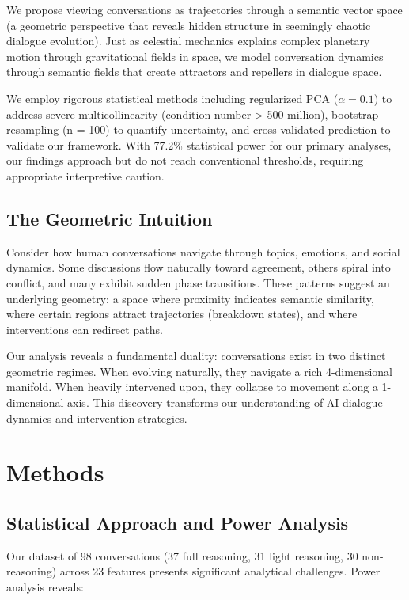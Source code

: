 \documentclass[11pt,letterpaper]{article}
\newcommand{\totalConversations}{98}
\newcommand{\fullReasoningCount}{37}
\newcommand{\lightReasoningCount}{31}
\newcommand{\nonReasoningCount}{30}
\newcommand{\featureCount}{23}
\newcommand{\powerOutcomeGroups}{77.2\%}
\newcommand{\regularizationAlpha}{0.1}
\newcommand{\bootstrapSamples}{100}
\begin{document}
We propose viewing conversations as trajectories through a semantic vector space (a geometric perspective that reveals hidden structure in seemingly chaotic dialogue evolution). Just as celestial mechanics explains complex planetary motion through gravitational fields in space, we model conversation dynamics through semantic fields that create attractors and repellers in dialogue space.

We employ rigorous statistical methods including regularized PCA ($\alpha = \regularizationAlpha{}$) to address severe multicollinearity (condition number > 500 million), bootstrap resampling (n = \bootstrapSamples{}) to quantify uncertainty, and cross-validated prediction to validate our framework. With \powerOutcomeGroups{} statistical power for our primary analyses, our findings approach but do not reach conventional thresholds, requiring appropriate interpretive caution.

\subsection{The Geometric Intuition}

Consider how human conversations navigate through topics, emotions, and social dynamics. Some discussions flow naturally toward agreement, others spiral into conflict, and many exhibit sudden phase transitions. These patterns suggest an underlying geometry: a space where proximity indicates semantic similarity, where certain regions attract trajectories (breakdown states), and where interventions can redirect paths.

Our analysis reveals a fundamental duality: conversations exist in two distinct geometric regimes. When evolving naturally, they navigate a rich 4-dimensional manifold. When heavily intervened upon, they collapse to movement along a 1-dimensional axis. This discovery transforms our understanding of AI dialogue dynamics and intervention strategies.

\section{Methods}

\subsection{Statistical Approach and Power Analysis}

Our dataset of \totalConversations{} conversations (\fullReasoningCount{} full reasoning, \lightReasoningCount{} light reasoning, \nonReasoningCount{} non-reasoning) across \featureCount{} features presents significant analytical challenges. Power analysis reveals:
\end{document}
